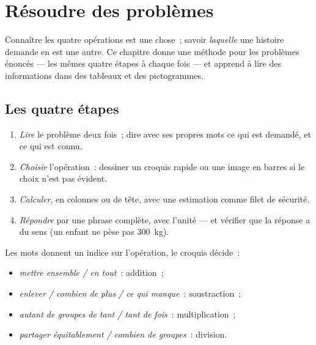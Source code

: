 \chapter{Résoudre des problèmes}\label{ch:g3:problems}

Connaître les quatre opérations est une chose~; savoir
\emph{laquelle} une histoire demande en est une autre. Ce chapitre
donne une méthode pour les problèmes énoncés --- les mêmes
quatre étapes à chaque fois --- et apprend à lire des
informations dans des tableaux et des pictogrammes.

\section{Les quatre étapes}

\begin{method}\label{met:g3:problems:steps}
\begin{enumerate}
  \item \emph{Lire} le problème deux fois~; dire avec ses propres
        mots ce qui est demandé, et ce qui est connu.
  \item \emph{Choisir} l'opération~: dessiner un croquis rapide ou
        une image en barres si le choix n'est pas évident.
  \item \emph{Calculer}, en colonnes ou de tête, avec une estimation
        comme filet de sécurité.
  \item \emph{Répondre} par une phrase complète, avec l'unité
        --- et vérifier que la réponse a du sens (un enfant ne
        pèse pas $300$~kg).
\end{enumerate}
\end{method}

\begin{example}\label{ex:g3:problems:which}
Les mots donnent un indice sur l'opération, le croquis décide~:
\begin{itemize}
  \item \emph{mettre ensemble / en tout}~: addition~;
  \item \emph{enlever / combien de plus / ce qui manque}~:
        soustraction~;
  \item \emph{autant de groupes de tant / tant de fois}~:
        multiplication~;
  \item \emph{partager équitablement / combien de groupes}~:
        division.
\end{itemize}
\end{example}

